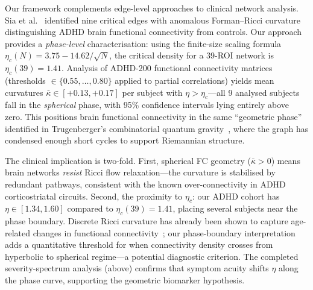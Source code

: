 \documentclass[11pt,a4paper]{article}
\newcommand{\kbar}{\bar{\kappa}}
\newcommand{\etac}{\eta_c}
\begin{document}
Our framework complements edge-level approaches to clinical network analysis. Sia et al.~\cite{sia2021forman} identified nine critical edges with anomalous Forman--Ricci curvature distinguishing ADHD brain functional connectivity from controls. Our approach provides a \emph{phase-level} characterisation: using the finite-size scaling formula $\etac(N) = 3.75 - 14.62/\sqrt{N}$, the critical density for a 39-ROI network is $\etac(39) = 1.41$. Analysis of ADHD-200 functional connectivity matrices (thresholds $\in\{0.55,\ldots,0.80\}$ applied to partial correlations) yields mean curvatures $\kbar \in [+0.13, +0.17]$ per subject with $\eta > \etac$---all 9 analysed subjects fall in the \emph{spherical} phase, with 95\% confidence intervals lying entirely above zero. This positions brain functional connectivity in the same ``geometric phase'' identified in Trugenberger's combinatorial quantum gravity~\cite{trugenberger2017combinatorial}, where the graph has condensed enough short cycles to support Riemannian structure.

The clinical implication is two-fold. First, spherical FC geometry ($\kbar > 0$) means brain networks \emph{resist} Ricci flow relaxation---the curvature is stabilised by redundant pathways, consistent with the known over-connectivity in ADHD corticostriatal circuits. Second, the proximity to $\etac$: our ADHD cohort has $\eta \in [1.34, 1.60]$ compared to $\etac(39) = 1.41$, placing several subjects near the phase boundary. Discrete Ricci curvature has already been shown to capture age-related changes in functional connectivity~\cite{frontiers2023ricci}; our phase-boundary interpretation adds a quantitative threshold for when connectivity density crosses from hyperbolic to spherical regime---a potential diagnostic criterion. The completed severity-spectrum analysis (above) confirms that symptom acuity shifts $\eta$ along the phase curve, supporting the geometric biomarker hypothesis.
\end{document}
